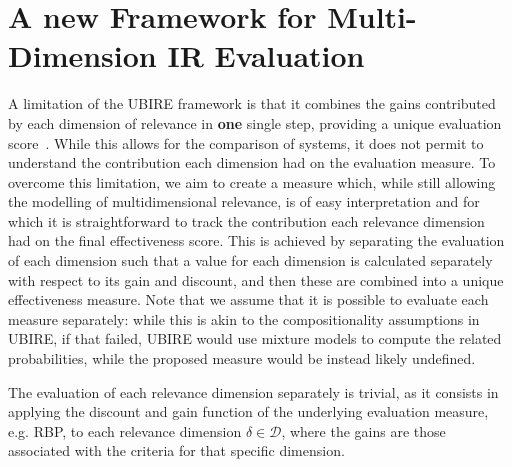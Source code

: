 
\section{A new Framework for Multi-Dimension IR Evaluation}
\label{sec:extension}

A limitation of the UBIRE framework is that it combines the gains contributed by each dimension of relevance in \textbf{one} single step, providing a unique evaluation score~\cite{zuccon14,zuccon16}.
While this allows for the comparison of systems, it does not permit to understand the contribution each dimension had on the evaluation measure. 
To overcome this limitation, we aim to create a measure which, while still allowing the modelling of multidimensional relevance, is of easy interpretation and for which it is straightforward to track the contribution each relevance dimension had on the final effectiveness score. This is achieved by separating the evaluation of each dimension such that a value for each dimension is calculated separately with respect to its gain and discount, and then these are combined into a unique effectiveness measure. Note that we assume that it is possible to evaluate each measure separately: while this is akin to the compositionality assumptions in UBIRE, if that failed, UBIRE would use mixture models to compute the related probabilities, while the proposed measure would be instead likely undefined. 

The evaluation of each relevance dimension separately is trivial, as it consists in applying the discount and gain function of the underlying evaluation measure, e.g. RBP, to each relevance dimension $\delta \in \mathcal{D}$, where the gains are those associated with the criteria for that specific dimension. 




